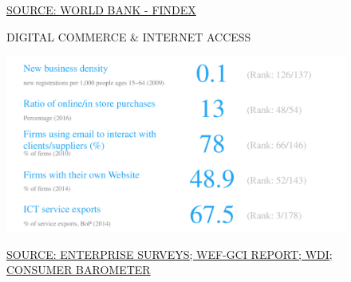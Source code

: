 \documentclass{article}\usepackage[]{graphicx}\usepackage[]{color}
\makeatletter
\def\maxwidth{ %
  \ifdim\Gin@nat@width>\linewidth
    \linewidth
  \else
    \Gin@nat@width
  \fi
}
\makeatother
\begin{document}
\begin{figure}
\begin{minipage}[c]{0.95\textwidth}
\begin{minipage}[b]{0.95\textwidth}
\begin{minipage}[c]{0.48\textwidth}
{}



      \vspace*{-0.1cm} 
      \scriptsize{\href{NA}{\textcolor[HTML]{22A6F5}{SOURCE: WORLD BANK - FINDEX}}}
    \end{minipage}
    \begin{minipage}[c]{0.48\textwidth} %
      \small{\textcolor[HTML]{818181}{DIGITAL COMMERCE \& INTERNET ACCESS}}
      \vspace{1ex}


{\centering \includegraphics[width=\maxwidth]{figure/number_chart_Markets-1} 

}



      \vspace{2ex}
      \hspace{4ex}\scriptsize{\href{NA}{\textcolor[HTML]{22A6F5}{SOURCE: ENTERPRISE SURVEYS; WEF-GCI REPORT; WDI; CONSUMER BAROMETER}}}
    \end{minipage}
  \end{minipage}  


\end{minipage}
\end{figure}
\end{document}
